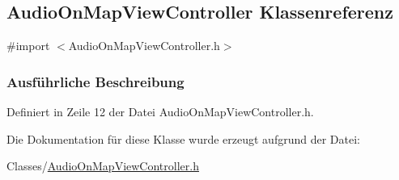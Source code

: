 \hypertarget{interface_audio_on_map_view_controller}{
\subsection{AudioOnMapViewController Klassenreferenz}
\label{interface_audio_on_map_view_controller}
}


{\ttfamily \#import $<$AudioOnMapViewController.h$>$}

\subsubsection{Ausführliche Beschreibung}


Definiert in Zeile 12 der Datei AudioOnMapViewController.h.

Die Dokumentation für diese Klasse wurde erzeugt aufgrund der Datei:\begin{DoxyCompactItemize}
\item 
Classes/\hyperlink{_audio_on_map_view_controller_8h}{AudioOnMapViewController.h}\end{DoxyCompactItemize}
